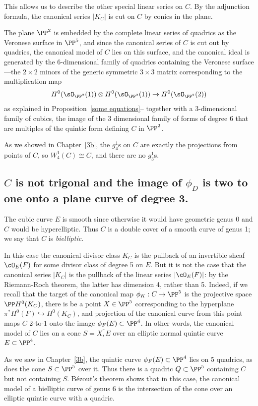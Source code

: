 This allows us to describe the other special linear series on $C$. By the adjunction formula, the canonical series $|K_C|$ is cut on $C$ by conics in the plane. 

The plane $\PP^2$ is embedded by the complete linear series of quadrics as the Veronese surface in $\PP^5$, and since the canonical series of $C$ is cut out by quadrics, the canonical model of $C$
lies on this surface, and the canonical ideal is generated by the 6-dimensional family of quadrics containing the Veronese surface---the $2\times 2$ minors of the generic symmetric $3\times 3$ matrix
corresponding to the multiplication map 
$$
H^{0}(\sO_{\PP^{2}}(1)) \otimes H^{0}(\sO_{\PP^{2}}(1)) \to H^{0}(\sO_{\PP^{2}}(2))
$$
as explained in Proposition~\ref{some equations}-- together with a 3-dimensional family of cubics,  the image of the 3 dimensional family of forms of degree 6 that are multiples of the quintic form defining $C$ in $\PP^2$.

As we showed in Chapter~\ref{3b}, the $g^1_4$s on $C$ are exactly the projections from points of $C$, so $W^1_4(C)\cong C$, and there are no 
$g^{1}_{3}$s.


\subsection{$C$ is not trigonal and the image of $\phi_{D}$ is two to one onto a  plane curve of degree 3.}

The cubic curve $E$ is smooth since otherwise it would have geometric genus 0 and $C$ would be  hyperelliptic. Thus $C$ is a double cover of a smooth curve of genus 1; we say that $C$ is \emph{bielliptic}.

In this case the canonical divisor class $K_C$ is the pullback of an invertible sheaf $\cO_E(F)$ for some divisor class of degree 5 on $E$. But it is not the case that the canonical series $|K_C|$ is the pullback of the linear series $|\cO_E(F)|$: by the Riemann-Roch theorem, the latter has dimension 4, rather than 5. Indeed, if we recall that the target of the canonical map $\phi_K : C \to \PP^5$ is the projective space $\PP H^0(K_C)$, there is be a point $X \in \PP^5$ corresponding to the hyperplane $\pi^*H^0(F) \hookrightarrow H^0(K_C)$, and projection of the canonical curve from this point maps $C$ 2-to-1 onto the image $\phi_F(E) \subset \PP^4$. In other words, the canonical model of $C$ lies on a cone $S = \overline{X, E}$ over an elliptic normal quintic curve $E \subset \PP^4$. 

As we saw in Chapter~\ref{3b}, the quintic curve $\phi_F(E) \subset \PP^4$ lies on 5 quadrics, as does the cone $S \subset \PP^5$ over it. Thus there is a quadric $Q \subset \PP^5$ containing $C$ but not containing $S$. B\'ezout's theorem shows that in this case, the canonical model of a bielliptic curve of genus 6 is the intersection of the cone over an elliptic quintic curve with a quadric.

